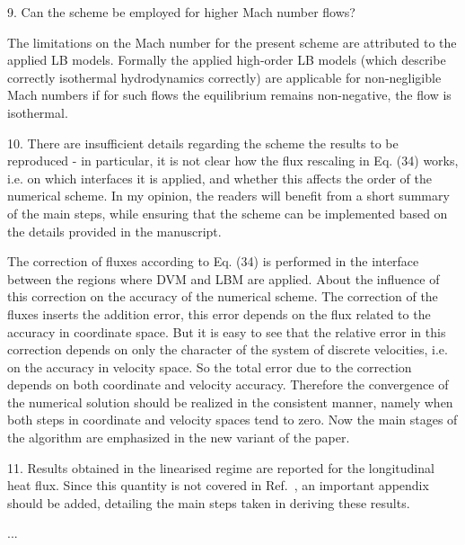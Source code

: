 \documentclass{article}
\begin{document}
\begin{quoting}
    9. Can the scheme be employed for higher Mach number flows?
\end{quoting}

The limitations on the Mach number for the present scheme are attributed to the applied LB models.
Formally the applied high-order LB models (which describe correctly isothermal hydrodynamics correctly)
are applicable for non-negligible Mach numbers if for such flows the equilibrium remains non-negative,
the flow is isothermal.

\begin{leftbar}
\end{leftbar}

\begin{quoting}
    10. There are insufficient details regarding the scheme
    the results to be reproduced - in particular, it is not
    clear how the flux rescaling in Eq. (34) works, i.e. on
    which interfaces it is applied, and whether this affects
    the order of the numerical scheme. In my opinion, the
    readers will benefit from a short summary of the main
    steps, while ensuring that the scheme can be implemented
    based on the details provided in the manuscript.
\end{quoting}

The correction of fluxes according to Eq. (34) is performed in the interface
between the regions where DVM and LBM are applied.
About the influence of this correction on the accuracy of the numerical scheme.
The correction of the fluxes inserts the addition error,
this error depends on the flux related to the accuracy in coordinate space.
But it is easy to see that the relative error in this correction
depends on only the character of the system of discrete velocities,
i.e. on the accuracy in velocity space.
So the total error due to the correction depends on both coordinate and velocity accuracy.
Therefore the convergence of the numerical solution should be realized in the consistent manner,
namely when both steps in coordinate and velocity spaces tend to zero.
Now the main stages of the algorithm are emphasized in the new variant of the paper.

\begin{leftbar}
\end{leftbar}

\begin{quoting}
    11. Results obtained in the linearised regime are
    reported for the longitudinal heat flux. Since this
    quantity is not covered in Ref.~\cite{Luo2016}, an important
    appendix should be added, detailing the main steps
    taken in deriving these results.
\end{quoting}

...

\begin{leftbar}
\end{leftbar}

\printbibliography
\end{document}
